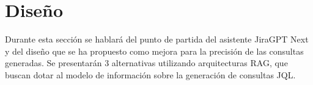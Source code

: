 \section{Diseño}
Durante esta sección se hablará del punto de partida del asistente JiraGPT Next y del diseño que se ha propuesto como mejora para la precisión de las consultas generadas. Se presentarán 3 alternativas utilizando arquitecturas RAG, que buscan dotar al modelo de información sobre la generación de consultas JQL.


